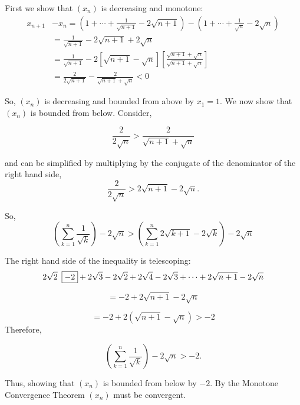 \documentclass{report}
\begin{document}
\begin{myproof}
  First we show that $(x_n)$ is decreasing and monotone:
$$
\begin{aligned}
  x_{n+1} & -x_n=\left(1+\cdots+\frac{1}{\sqrt{n+1}}-2 \sqrt{n+1}\right)-\left(1+\cdots+\frac{1}{\sqrt{n}} - 2 \sqrt{n}\right) \\
& =\frac{1}{\sqrt{n+1}}-2 \sqrt{n+1}+2 \sqrt{n} \\
& =\frac{1}{\sqrt{n+1}}-2[\sqrt{n+1}-\sqrt{n}]\left[\frac{\sqrt{n+1}+\sqrt{n}}{\sqrt{n+1}+\sqrt{n}}\right] \\
& =\frac{2}{2\sqrt{n+1}}-\frac{2}{\sqrt{n+1}+\sqrt{n}}<0
\end{aligned}
$$

So, $\left(x_n\right)$ is decreasing and bounded from above by $x_1 = 1.$
We now show that $(x_n)$ is bounded from below. Consider,

$$\frac{2}{2 \sqrt{n}} > \frac{2}{\sqrt{n+1} + \sqrt{n}}$$

and can be simplified by multiplying by the conjugate of the denominator of the right hand side,
 $$\frac{2}{2 \sqrt{n}} > 2\sqrt{n+1} - 2\sqrt{n}.$$
 

 So,
 $$
\left(\sum_{k=1}^{n} \frac{1}{\sqrt{k}} \right)-2 \sqrt{n} > \left( \sum_{k=1}^{n} 2\sqrt{k+1} - 2\sqrt{k} \right) - 2\sqrt{n}
 $$

The right hand side of the inequality is telescoping:
 $$
 2\sqrt{2} \hspace{0.5em}\boxed{-2} + 2\sqrt{3}- 2\sqrt{2} + 2\sqrt{4} - 2\sqrt{3}+ \cdots + 2\sqrt{n+1} - 2\sqrt{n}
$$

 $$
 = -2  + 2\sqrt{n+1}- 2\sqrt{n}
$$

 $$
 = -2  + 2(\sqrt{n+1}- \sqrt{n}) > -2
$$
Therefore,

$$\left(\sum_{k=1}^{n} \frac{1}{\sqrt{k}} \right)-2 \sqrt{n} > -2.$$

Thus, showing that $(x_n)$ is bounded from below by $-2$. By the Monotone Convergence Theorem $(x_n)$ must be convergent.

\end{myproof}

\end{document}
